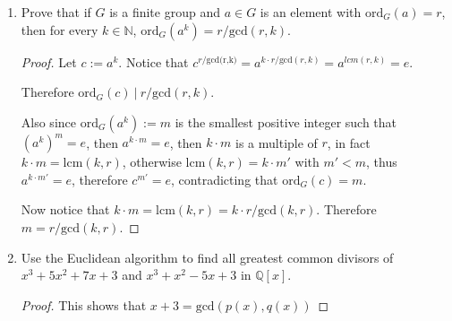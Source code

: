 \documentclass[12pt]{article}
\begin{document}
\begin{enumerate}
\begin{proof}
    Assume for a contradiction that $\textrm{ord}_G(b) \not | \; \textrm{ord}_G(a)$. From a previous theorem, there must exist $c \in G$ such that $\textrm{ord}_G(c) = \textrm{lcm}(\textrm{ord}_G(a), \textrm{ord}_G(b))$. Since $a$ is of maximal order in $G$, then $\textrm{ord}_G(a) \leq \textrm{lcm}(\textrm{ord}_G(a), \textrm{ord}_G(b)) \leq \textrm{ord}_G(a)$. This implies that $\textrm{ord}_G(a)$ is a multiple of $\textrm{ord}_G(b)$.
    
    This is a contradiction.
    \end{proof}
    
    \item Prove that if $G$ is a finite group and $a \in G$ is an element with $\textrm{ord}_G(a)=r$, then for every $k \in \mathbb{N}$, $\textrm{ord}_G(a^k) = r/ \textrm{gcd}(r,k)$.
    
    \begin{proof}
        Let $c:= a^k$. Notice that $c^{r/\textrm{gcd(r,k)}} = a^{k \cdot r / \textrm{gcd}(r,k)} = a^{lcm(r,k)} = e$.
        
        Therefore $\textrm{ord}_G(c) \: | \: r /\textrm{gcd}(r,k)$.
        
        Also since $\textrm{ord}_G(a^k):= m$ is the smallest positive integer such that $(a^k)^m = e$, then $a^{k \cdot m} = e$, then $k\cdot m$ is a multiple of $r$, in fact $k \cdot m = \textrm{lcm}(k,r)$, otherwise $\textrm{lcm}(k,r) = k \cdot m'$ with $m' < m$, thus $a^{k\cdot m'} = e$, therefore $c^{m'} = e$, contradicting that $\textrm{ord}_G(c) = m$.
        
        Now notice that $k \cdot m = \textrm{lcm}(k,r) = k \cdot r / \textrm{gcd}(k,r)$. Therefore $ m = r/\textrm{gcd}(k,r)$.
    \end{proof}
    
    \item Use the Euclidean algorithm to find all greatest common divisors of $x^3+ 5x^2+7x+3$ and $x^3+x^2-5x+3$ in $\mathbb{Q}[x]$.
    
    \begin{proof}
    
    
    
    
    This shows that $x+3= \textrm{gcd}(p(x),q(x))$ 
    \end{proof}
    

\end{enumerate}
\end{document}
